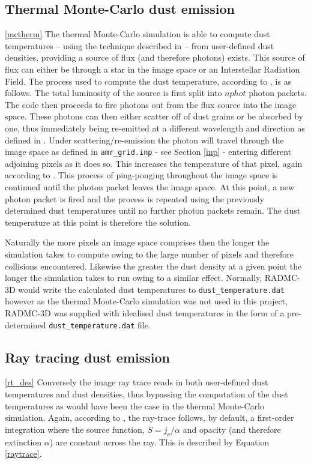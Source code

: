 \documentclass{report}
\begin{document}
\subsection{Thermal Monte-Carlo dust emission} \ref{mctherm}
The thermal Monte-Carlo simulation is able to compute dust temperatures – using the technique described in \textcite{b&w} – from user-defined dust densities, providing a source of flux (and therefore photons) exists. This source of flux can either be through a star in the image space or an Interstellar Radiation Field. The process used to compute the dust temperature, according to \textcite{manual}, is as follows. The total luminosity of the source is first split into $nphot$ photon packets. The code then proceeds to \textquotesingle fire \textquotesingle photons out from the flux source into the image space. These photons can then either scatter off of dust grains or be absorbed by one, thus immediately being re-emitted at a different wavelength and direction as defined in \textcite{b&w}. Under scattering/re-emission the photon will travel through the image space as defined in \texttt{amr\_grid.inp} - see Section \ref{inp} - entering different adjoining pixels as it does so. This increases the temperature of that pixel, again according to \textcite{b&w}. This process of \textquotesingle ping-ponging \textquotesingle throughout the image space is continued until the photon packet leaves the image space. At this point, a new photon packet is \textquotesingle fired \textquotesingle and the process is repeated using the previously determined dust temperatures until no further photon packets remain. The dust temperature at this point is therefore the solution.

Naturally the more pixels an image space comprises then the longer the simulation takes to compute owing to the large number of pixels and therefore collisions encountered. Likewise the greater the dust density at a given point the longer the simulation takes to run owing to a similar effect. Normally, RADMC-3D would write the calculated dust temperatures to \texttt{dust\_temperature.dat} however as the thermal Monte-Carlo simulation was not used in this project, RADMC-3D was supplied with idealised dust temperatures in the form of a pre-determined \texttt{dust\_temperature.dat} file.

\subsection{Ray tracing dust emission} \ref{rt_des}
Conversely the image ray trace reads in both user-defined dust temperatures and dust densities, thus bypassing the computation of the dust temperatures as would have been the case in the thermal Monte-Carlo simulation. Again, according to \textcite{manual}, the ray-trace follows, by default, a first-order integration where the source function, $S = j_{\nu}/\alpha$ and opacity (and therefore extinction $\alpha$) are constant across the ray. This is described by Equation \ref{raytrace}.
\end{document}
